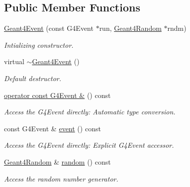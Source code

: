 \subsection*{Public Member Functions}
\begin{DoxyCompactItemize}
\item 
\hyperlink{class_d_d4hep_1_1_simulation_1_1_geant4_event_a3e3bf4d4021aa3a90e66678f52b7f0e9}{Geant4Event} (const G4Event $\ast$run, \hyperlink{class_d_d4hep_1_1_simulation_1_1_geant4_random}{Geant4Random} $\ast$rndm)
\begin{DoxyCompactList}\small\item\em Intializing constructor. \item\end{DoxyCompactList}\item 
virtual \hyperlink{class_d_d4hep_1_1_simulation_1_1_geant4_event_ab98455cace8f9234b238e350c2299fd0}{$\sim$Geant4Event} ()
\begin{DoxyCompactList}\small\item\em Default destructor. \item\end{DoxyCompactList}\item 
\hyperlink{class_d_d4hep_1_1_simulation_1_1_geant4_event_aeecd69c0d548e5f307f01a94ac9ed132}{operator const G4Event \&} () const 
\begin{DoxyCompactList}\small\item\em Access the G4Event directly: Automatic type conversion. \item\end{DoxyCompactList}\item 
const G4Event \& \hyperlink{class_d_d4hep_1_1_simulation_1_1_geant4_event_a85bac44c4e4c1d442df960361cda94fc}{event} () const 
\begin{DoxyCompactList}\small\item\em Access the G4Event directly: Explicit G4Event accessor. \item\end{DoxyCompactList}\item 
\hyperlink{class_d_d4hep_1_1_simulation_1_1_geant4_random}{Geant4Random} \& \hyperlink{class_d_d4hep_1_1_simulation_1_1_geant4_event_a6d3669fb2ba85939926297de1eb160f7}{random} () const 
\begin{DoxyCompactList}\small\item\em Access the random number generator. \item\end{DoxyCompactList}\item 

\end{DoxyCompactItemize}
